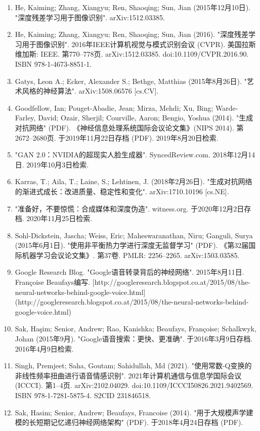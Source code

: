\begin{enumerate}
\item He, Kaiming; Zhang, Xiangyu; Ren, Shaoqing; Sun, Jian (2015年12月10日). "深度残差学习用于图像识别". arXiv:1512.03385.
\item He, Kaiming; Zhang, Xiangyu; Ren, Shaoqing; Sun, Jian (2016). "深度残差学习用于图像识别". 2016年IEEE计算机视觉与模式识别会议 (CVPR). 美国拉斯维加斯: IEEE. 第770–778页. arXiv:1512.03385. doi:10.1109/CVPR.2016.90. ISBN 978-1-4673-8851-1.
\item Gatys, Leon A.; Ecker, Alexander S.; Bethge, Matthias (2015年8月26日). "艺术风格的神经算法". arXiv:1508.06576 [cs.CV].
\item Goodfellow, Ian; Pouget-Abadie, Jean; Mirza, Mehdi; Xu, Bing; Warde-Farley, David; Ozair, Sherjil; Courville, Aaron; Bengio, Yoshua (2014). "生成对抗网络" (PDF). 《神经信息处理系统国际会议论文集》(NIPS 2014). 第2672–2680页. 于2019年11月22日存档 (PDF). 2019年8月20日检索.
\item "GAN 2.0：NVIDIA的超现实人脸生成器". SyncedReview.com. 2018年12月14日. 2019年10月3日检索.
\item Karras, T.; Aila, T.; Laine, S.; Lehtinen, J. (2018年2月26日). "生成对抗网络的渐进式成长：改进质量、稳定性和变化". arXiv:1710.10196 [cs.NE].
\item "准备好，不要惊慌：合成媒体和深度伪造". witness.org. 于2020年12月2日存档. 2020年11月25日检索.
\item Sohl-Dickstein, Jascha; Weiss, Eric; Maheswaranathan, Niru; Ganguli, Surya (2015年6月1日). "使用非平衡热力学进行深度无监督学习" (PDF). 《第32届国际机器学习会议论文集》. 第37卷. PMLR: 2256–2265. arXiv:1503.03585.
\item Google Research Blog. "Google语音转录背后的神经网络". 2015年8月11日. Françoise Beaufays编写. [http://googleresearch.blogspot.co.at/2015/08/the-neural-networks-behind-google-voice.html](http://googleresearch.blogspot.co.at/2015/08/the-neural-networks-behind-google-voice.html)
\item Sak, Haşim; Senior, Andrew; Rao, Kanishka; Beaufays, Françoise; Schalkwyk, Johan (2015年9月). "Google语音搜索：更快、更准确". 于2016年3月9日存档. 2016年4月9日检索.
\item Singh, Premjeet; Saha, Goutam; Sahidullah, Md (2021). "使用常数-Q变换的非线性频率扭曲进行语音情感识别". 2021年计算机通信与信息学国际会议 (ICCCI). 第1–4页. arXiv:2102.04029. doi:10.1109/ICCCI50826.2021.9402569. ISBN 978-1-7281-5875-4. S2CID 231846518.
\item Sak, Hasim; Senior, Andrew; Beaufays, Francoise (2014). "用于大规模声学建模的长短期记忆递归神经网络架构" (PDF). 于2018年4月24日存档 (PDF).

\end{enumerate}
